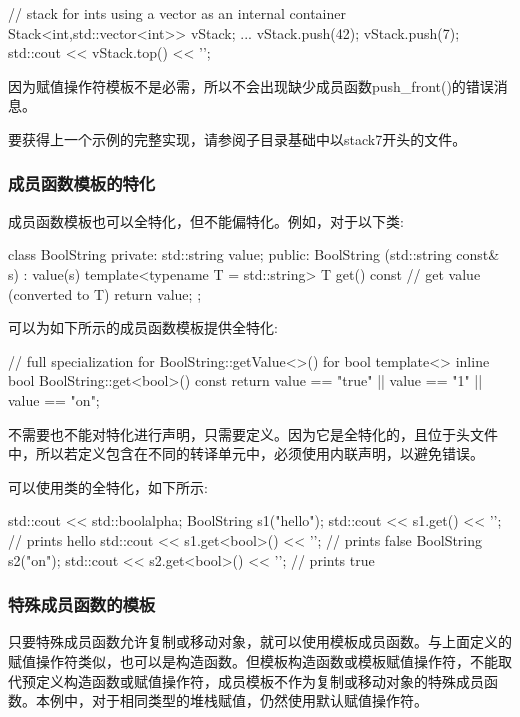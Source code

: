 \begin{cpp}
// stack for ints using a vector as an internal container
Stack<int,std::vector<int>> vStack;
...
vStack.push(42);
vStack.push(7);
std::cout << vStack.top() << '\n';
\end{cpp}

因为赋值操作符模板不是必需，所以不会出现缺少成员函数push\_front()的错误消息。

要获得上一个示例的完整实现，请参阅子目录基础中以stack7开头的文件。

\subsubsection{成员函数模板的特化}

成员函数模板也可以全特化，但不能偏特化。例如，对于以下类:

\begin{cpp}
class BoolString {
private:
	std::string value;
public:
	BoolString (std::string const& s)
	: value(s) {
	}
	template<typename T = std::string>
	T get() const { // get value (converted to T)
		return value;
	}
};
\end{cpp}

可以为如下所示的成员函数模板提供全特化:

\begin{cpp}
// full specialization for BoolString::getValue<>() for bool
template<>
inline bool BoolString::get<bool>() const {
	return value == "true" || value == "1" || value == "on";
}
\end{cpp}

不需要也不能对特化进行声明，只需要定义。因为它是全特化的，且位于头文件中，所以若定义包含在不同的转译单元中，必须使用内联声明，以避免错误。

可以使用类的全特化，如下所示:

\begin{cpp}
std::cout << std::boolalpha;
BoolString s1("hello");
std::cout << s1.get() << '\n'; // prints hello
std::cout << s1.get<bool>() << '\n'; // prints false
BoolString s2("on");
std::cout << s2.get<bool>() << '\n'; // prints true
\end{cpp}

\subsubsection{特殊成员函数的模板}

只要特殊成员函数允许复制或移动对象，就可以使用模板成员函数。与上面定义的赋值操作符类似，也可以是构造函数。但模板构造函数或模板赋值操作符，不能取代预定义构造函数或赋值操作符，成员模板不作为复制或移动对象的特殊成员函数。本例中，对于相同类型的堆栈赋值，仍然使用默认赋值操作符。

